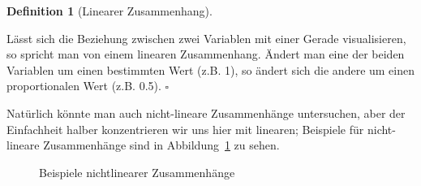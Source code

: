 \documentclass[
  a4paper,
  DIV=11]{scrreprt}
\theoremstyle{definition}
\theoremstyle{definition}
\theoremstyle{definition}
\newtheorem{definition}{Definition}[chapter]
\theoremstyle{remark}
\begin{document}
\begin{definition}[Linearer
Zusammenhang]\protect\hypertarget{def-lin-zshg}{}\label{def-lin-zshg}

Lässt sich die Beziehung zwischen zwei Variablen mit einer Gerade
visualisieren, so spricht man von einem linearen Zusammenhang. Ändert
man eine der beiden Variablen um einen bestimmten Wert (z.B. 1), so
ändert sich die andere um einen proportionalen Wert (z.B. 0.5).
\(\square\)

\end{definition}

Natürlich könnte man auch nicht-lineare Zusammenhänge untersuchen, aber
der Einfachheit halber konzentrieren wir uns hier mit linearen;
Beispiele für nicht-lineare Zusammenhänge sind in
Abbildung~\ref{fig-nonlinear} zu sehen.

\begin{figure}


\caption{\label{fig-nonlinear}Beispiele nichtlinearer Zusammenhänge}

\end{figure}%
\end{document}
